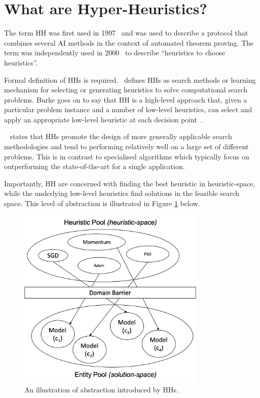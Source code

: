 \section{What are Hyper-Heuristics?}
\label{sec:hh:what_is_a_hh}

The term \acl{HH} was first used in 1997~\cite{ref:burke:2010} and was used to describe a protocol that combines several \ac{AI} methods in the context of automated theorem proving. The term was independently used in 2000~\cite{ref:cowling:2000} to describe ``heuristics to choose heuristics''.

Formal definition of \acp{HH} is required.~\citeauthor{ref:burke:2010}\cite{ref:burke:2010} defines \acp{HH} as search methods or learning mechanism for selecting or generating heuristics to solve computational search problems. Burke goes on to say that \ac{HH} is a high-level approach that, given a particular problem instance and a number of low-level heuristics, can select and apply an appropriate low-level heuristic at each decision point~\cite{ref:burke2003}.

\citeauthor{ref:grobler:2015}~\cite{ref:grobler:2015} states that \acp{HH} promote the design of more generally applicable search methodologies and tend to performing relatively well on a large set of different problems. This is in contrast to specialised algorithms which typically focus on outperforming the state-of-the-art for a single application.

Importantly, \ac{HH} are concerned with finding the best heuristic in heuristic-space, while the underlying low-level heuristics find solutions in the feasible search space. This level of abstraction is illustrated in Figure \ref{fig:heuristics:hh:hh_algorithm} below.

\begin{figure}[htbp]
      \begin{centering}
            \includegraphics[width=0.8\textwidth]{images/hh_high_level.png}
            \caption{An illustration of abstraction introduced by \acp{HH}.}
            \label{fig:heuristics:hh:hh_algorithm}
      \end{centering}
\end{figure}

